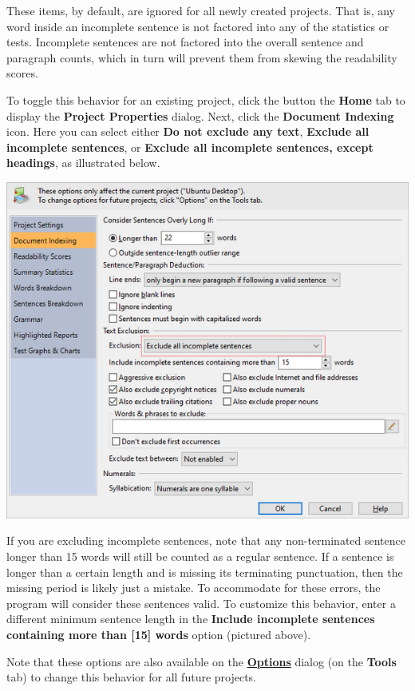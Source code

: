 \documentclass[
]{book}
\theoremstyle{definition}
\theoremstyle{definition}
\theoremstyle{definition}
\theoremstyle{definition}
\theoremstyle{remark}
\begin{document}
These items, by default, are ignored for all newly created projects. That is, any word inside an incomplete sentence is not factored into any of the statistics or tests. Incomplete sentences are not factored into the overall sentence and paragraph counts, which in turn will prevent them from skewing the readability scores.

To toggle this behavior for an existing project, click the  button the \textbf{Home} tab to display the \textbf{Project Properties} dialog. Next, click the \textbf{Document Indexing} icon. Here you can select either \textbf{Do not exclude any text}, \textbf{Exclude all incomplete sentences}, or \textbf{Exclude all incomplete sentences, except headings}, as illustrated below.

\includegraphics{Images/excludeincompletesentences.png}

If you are excluding incomplete sentences, note that any non-terminated sentence longer than 15 words will still be counted as a regular sentence. If a sentence is longer than a certain length and is missing its terminating punctuation, then the missing period is likely just a mistake. To accommodate for these errors, the program will consider these sentences valid. To customize this behavior, enter a different minimum sentence length in the \textbf{Include incomplete sentences containing more than {[}15{]} words} option (pictured above).

Note that these options are also available on the \protect\hyperlink{options-overview}{\textbf{Options}} dialog (on the \textbf{Tools} tab) to change this behavior for all future projects.
\end{document}
